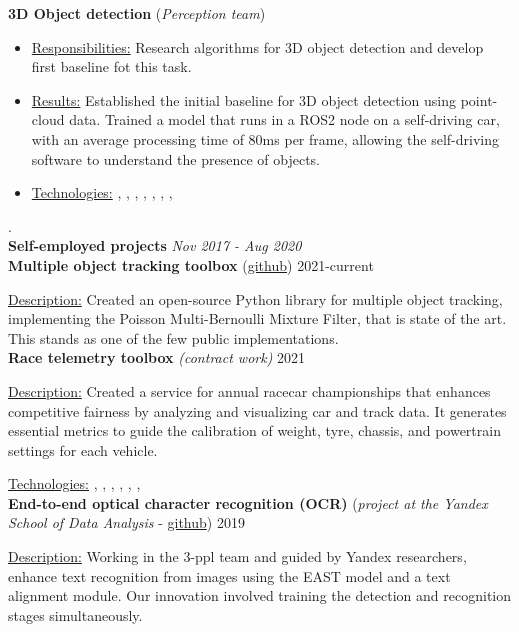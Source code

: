 \textbf{3D Object detection} (\textit{Perception team})
\begin{itemize}
    \item[] \underline{Responsibilities:} Research algorithms for 3D object detection and develop first baseline fot this task.
    \item[] \underline{Results:} Established the initial baseline for 3D object detection using point-cloud data. Trained a model that runs in a ROS2 node on a self-driving car, with an average processing time of 80ms per frame, allowing the self-driving software to understand the presence of objects.
    \item[] \underline{Technologies:} , , , , , , ,  
\end{itemize}
\par .\\
%
\textbf{Self-employed projects}  \hfill \textit{Nov 2017 - Aug 2020}  
\\
\textbf{Multiple object tracking toolbox} (\href{https://github.com/neer201/Multi-Object-Tracking-for-Automotive-Systems-in-python}{github}) \hfill 2021-current

\underline{Description:} Created an open-source Python library for multiple object tracking, implementing the Poisson Multi-Bernoulli Mixture Filter, that is state of the art. This stands as one of the few public implementations.\\
\textbf{Race telemetry toolbox} \textit{(contract work)} \hfill 2021
\par
\underline{Description:} Created a service for annual racecar championships that enhances competitive fairness by analyzing and visualizing car and track data. It generates essential metrics to guide the calibration of weight, tyre, chassis, and powertrain settings for each vehicle.

\underline{Technologies:} , , , , , , 
\\
\textbf{End-to-end optical character recognition (OCR)} (\textit{project at the Yandex School of Data Analysis} - \href{https://github.com/neer201/end2end_OCR}{github})  \hfill 2019
\par
\underline{Description:} Working in the 3-ppl team and guided by Yandex researchers, enhance text recognition from images using the EAST model and a text alignment module. Our innovation involved training the detection and recognition stages simultaneously.

